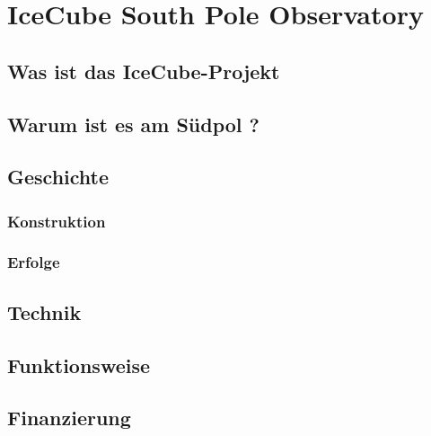\chapter{IceCube South Pole Observatory} 
    \vspace{8pt}
    \section{Was ist das IceCube-Projekt}
    \section{Warum ist es am Südpol ?}
    \section{Geschichte}
    \subsection{Konstruktion}
    \subsection{Erfolge}
    \section{Technik}
    \section{Funktionsweise}
    \section{Finanzierung}
